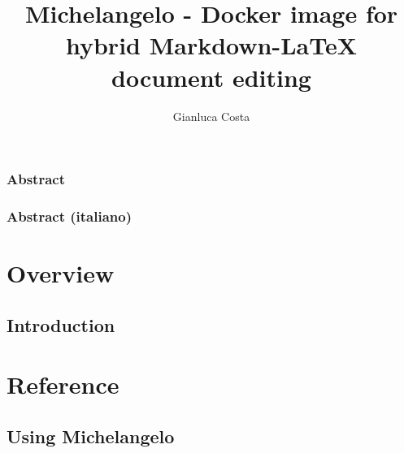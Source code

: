 \documentclass[11pt, a4paper]{book}
\begin{document}
\title{Michelangelo - Docker image for hybrid Markdown-LaTeX document editing}
\author{Gianluca Costa}

\maketitle

\newpage
\section*{Abstract}


\newpage
\section*{Abstract (italiano)}


\tableofcontents


\part{Overview}

\chapter{Introduction}



\part{Reference}

\chapter{Using Michelangelo}


\nocite{*}



\end{document}

